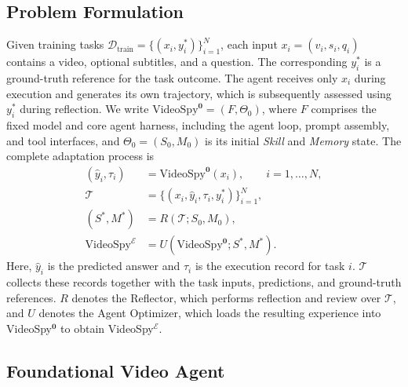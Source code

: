 \documentclass{article} %
\begin{document}
\subsection{Problem Formulation}

Given training tasks $\mathcal{D}_{\mathrm{train}}=\{(x_i,y_i^*)\}_{i=1}^{N}$, each input $x_i=(v_i,s_i,q_i)$ contains a video, optional subtitles, and a question. The corresponding $y_i^*$ is a ground-truth reference for the task outcome. The agent receives only $x_i$ during execution and generates its own trajectory, which is subsequently assessed using $y_i^*$ during reflection. We write $\mathrm{VideoSpy}^{\mathbf{0}}=(F,\Theta_0)$, where $F$ comprises the fixed model and core agent harness, including the agent loop, prompt assembly, and tool interfaces, and $\Theta_0=(S_0,M_0)$ is its initial \textit{Skill} and \textit{Memory} state. The complete adaptation process is
\begin{align}
(\hat y_i,\tau_i) &= \mathrm{VideoSpy}^{\mathbf{0}}(x_i), \qquad i=1,\ldots,N, \\
\mathcal{T} &= \{(x_i,\hat y_i,\tau_i,y_i^*)\}_{i=1}^{N}, \\
(S^*,M^*) &= R(\mathcal{T};S_0,M_0), \\
\mathrm{VideoSpy}^{\mathcal{E}} &= U(\mathrm{VideoSpy}^{\mathbf{0}};S^*,M^*).
\end{align}
Here, $\hat y_i$ is the predicted answer and $\tau_i$ is the execution record for task $i$. $\mathcal{T}$ collects these records together with the task inputs, predictions, and ground-truth references. $R$ denotes the Reflector, which performs reflection and review over $\mathcal{T}$, and $U$ denotes the Agent Optimizer, which loads the resulting experience into VideoSpy$^{\mathbf{0}}$ to obtain VideoSpy$^{\mathcal{E}}$.

\subsection{Foundational Video Agent}
\label{sec:foundational}
\end{document}
